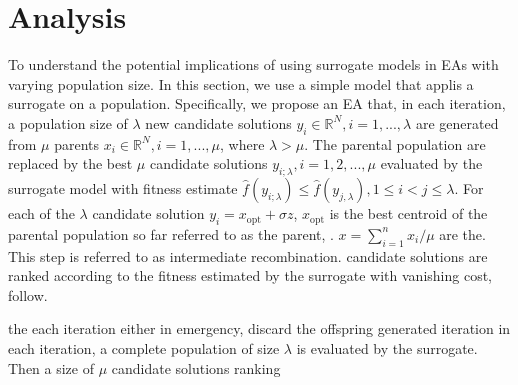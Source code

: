 \section{Analysis}


To understand the potential implications of using surrogate models in EAs with varying population size. 
In this section, we use a simple model that applis a surrogate on a population. Specifically, we propose an EA that, in each iteration, a population size of $\lambda$ new candidate solutions $y_i \in \mathbb{R}^N,i = 1,...,\lambda $ are generated from $\mu$ parents $x_i \in \mathbb{R}^N, i=1,...,\mu$, where $\lambda>\mu$. The parental population are replaced by the best $\mu$ candidate solutions $y_{i;\lambda},i = 1,2,...,\mu$ evaluated by the surrogate model with fitness estimate $\hat f(y_{i;\lambda}) \leq \hat f(y_{j,\lambda}), 1 \leq i < j \leq \lambda$. For each of the $\lambda$ candidate solution $y_i=x_{\text{opt}}+\sigma z$, $x_{\text{opt}}$ is the best centroid of the  parental population so far referred to as the parent, . $x = \sum_{i=1}^n x_i/\mu$ are the. This step is referred to as intermediate recombination.  
candidate solutions are ranked according to the fitness estimated by the surrogate with vanishing cost, follow.  

the each iteration either in emergency, discard the offspring generated iteration 
in  each iteration, a complete population of size $\lambda$ is evaluated by the surrogate. Then a size of $\mu$ candidate solutions ranking 



